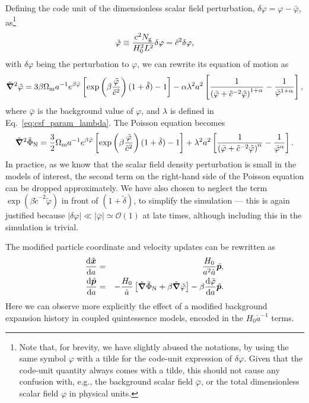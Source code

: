 Defining the code unit of the dimensionless scalar field perturbation, $\delta\varphi=\varphi-\bar{\varphi}$, as\footnote{Note that, for brevity, we have slightly abused the notations, by using the same symbol $\varphi$ with a tilde for the code-unit expression of $\delta\varphi$. Given that the code-unit quantity always comes with a tilde, this should not cause any confusion with, e.g., the background scalar field $\bar{\varphi}$, or the total dimensionless scalar field $\varphi$ in physical units.}
\begin{equation}
    \tilde{\varphi} \equiv \frac{c^2N_{\rm g}}{H_0^2L^2}\delta\varphi = \tilde{c}^2\delta\varphi,
\end{equation}
with $\delta\varphi$ being the perturbation to $\varphi$, we can rewrite its equation of motion as
\begin{equation}\label{eq:csf_eom_code}
    \tilde{\boldsymbol{\nabla}}^2\tilde{\varphi} = 3\beta{\Omega_{\rm m}}{a^{-1}}e^{\beta\bar{\varphi}}\left[\exp\left(\beta\frac{\tilde{\varphi}}{\tilde{c}^2}\right)(1+\tilde{\delta})-1\right] -\alpha\lambda^2a^2\left[\frac{1}{\left(\bar{\varphi}+\tilde{c}^{-2}\tilde{\varphi}\right)^{1+\alpha}}-\frac{1}{\bar{\varphi}^{1+\alpha}}\right],
\end{equation}
where $\bar{\varphi}$ is the background value of $\varphi$, and $\lambda$ is defined in Eq.~\eqref{eq:csf_param_lambda}. The Poisson equation becomes
\begin{equation}\label{eq:csf_poisson_code}
    \Tilde{\boldsymbol{\nabla}}^2\tilde{\Phi}_{\rm N} = \frac{3}{2}\Omega_{\rm m}a^{-1}e^{\beta\bar{\varphi}}\left[\exp\left(\beta\frac{\tilde{\varphi}}{\tilde{c}^2}\right)(1+\tilde{\delta})-1\right] + \lambda^2a^2\left[\frac{1}{\left(\bar{\varphi}+\tilde{c}^{-2}\tilde{\varphi}\right)^{\alpha}}-\frac{1}{\bar{\varphi}^{\alpha}}\right].
\end{equation}
In practice, as we know that the scalar field density perturbation is small in the models of interest, the second term on the right-hand side of the Poisson equation can be dropped approximately. We have also chosen to neglect the term $\exp\left(\beta\tilde{c}^{-2}\tilde{\varphi}\right)$ in front of $(1+\tilde{\delta})$, to simplify the simulation --- this is again justified because $|\delta\varphi|\ll|\bar{\varphi}|\simeq\mathcal{O}(1)$ at late times, although including this in the simulation is trivial.

The modified particle coordinate and velocity updates can be rewritten as
\begin{eqnarray}
    \label{eq:csf_particle_geodesic_code1}\frac{{\rm d}\tilde{\boldsymbol{x}}}{{\rm d}a} &=& \frac{H_0}{a^2\dot{a}}\tilde{\boldsymbol{p}},\\
    \label{eq:csf_particle_geodesic_code2}\frac{{\rm d}\tilde{\boldsymbol{p}}}{{\rm d}a} &=& -\frac{H_0}{\dot{a}}\left[\tilde{\boldsymbol{\nabla}}\tilde{\Phi}_{\rm N}+\beta\tilde{\boldsymbol{\nabla}}\tilde{\varphi}\right] - \beta\frac{{\rm d}\bar{\varphi}}{{\rm d}a}\tilde{\boldsymbol{p}}.
\end{eqnarray}
Here we can observe more explicitly the effect of a modified background expansion history in coupled quintessence models, encoded in the $H_0\dot{a}^{-1}$ terms.

